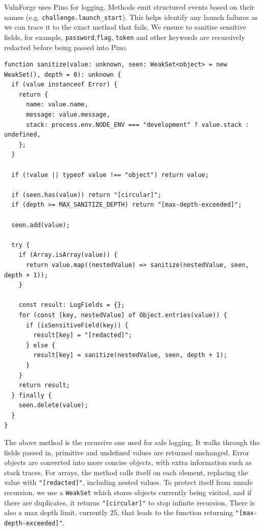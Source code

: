 VulnForge uses Pino for logging. Methods emit structured events based on their names (e.g. \lstinline{challenge.launch_start}). This helps identify any launch failures as we can trace it to the exact method that fails. We ensure to sanitise sensitive fields, for example, \lstinline{password},\lstinline{flag}, \lstinline{token} and other keywords are recursively redacted before being passed into Pino.

\begin{listing}[htbp]
	\begin{verbatim}
function sanitize(value: unknown, seen: WeakSet<object> = new WeakSet(), depth = 0): unknown {
  if (value instanceof Error) {
    return {
      name: value.name,
      message: value.message,
      stack: process.env.NODE_ENV === "development" ? value.stack : undefined,
    };
  }

  if (!value || typeof value !== "object") return value;

  if (seen.has(value)) return "[circular]";
  if (depth >= MAX_SANITIZE_DEPTH) return "[max-depth-exceeded]";

  seen.add(value);

  try {
    if (Array.isArray(value)) {
      return value.map((nestedValue) => sanitize(nestedValue, seen, depth + 1));
    }

    const result: LogFields = {};
    for (const [key, nestedValue] of Object.entries(value)) {
      if (isSensitiveField(key)) {
        result[key] = "[redacted]";
      } else {
        result[key] = sanitize(nestedValue, seen, depth + 1);
      }
    }
    return result;
  } finally {
    seen.delete(value);
  }
}
	\end{verbatim}
	\caption{Recursive implementation of sanitising logs}
	\label{lst:recursive-logs}
\end{listing}

The above method is the recursive one used for safe logging. It walks through the fields passed in, primitive and undefined values are returned unchanged. Error objects are converted into more concise objects, with extra information such as stack traces. For arrays, the method calls itself on each element, replacing the value with \lstinline{"[redacted]"}, including nested values. To protect itself from unsafe recursion, we use a \lstinline{WeakSet} which stores objects currently being visited, and if there are duplicates, it returns \lstinline{"[circular]"} to stop infinite recursion. There is also a max depth limit, currently 25, that leads to the function returning \lstinline{"[max-depth-exceeded]"}.

